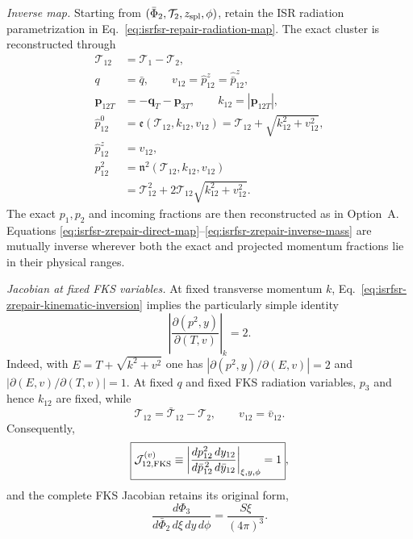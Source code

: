 \documentclass[11pt]{article}
\newcommand{\Ph}{\Phi}
\begin{document}
\medskip
\noindent
\textit{Inverse map.}
Starting from $(\bar\Ph_2,\mathcal T_2,z_{\rm spl},\phi)$, retain the ISR radiation parametrization in
Eq.~\eqref{eq:isrfsr-repair-radiation-map}.  The exact cluster is reconstructed through
\begin{align}
\mathcal T_{12}
&=\mathcal T_1-\mathcal T_2,
\label{eq:isrfsr-zrepair-inverse-T12}
\\
q&=\bar q,
\qquad
v_{12}=\hat p_{12}^z=\hat{\bar p}_{12}^z,
\label{eq:isrfsr-zrepair-inverse-preserved}
\\
\boldsymbol p_{12T}
&=-\boldsymbol q_T-\boldsymbol p_{3T},
\qquad
k_{12}=|\boldsymbol p_{12T}|,
\label{eq:isrfsr-zrepair-inverse-pt}
\\
\hat p_{12}^0
&=
\mathfrak e(\mathcal T_{12},k_{12},v_{12})
=
\mathcal T_{12}+\sqrt{k_{12}^2+v_{12}^2},
\nonumber\\
\hat p_{12}^z
&=v_{12},
\label{eq:isrfsr-zrepair-inverse-components}
\\
p_{12}^2
&=
\mathfrak n^2(\mathcal T_{12},k_{12},v_{12})
\nonumber\\
&=
\mathcal T_{12}^2
+2\mathcal T_{12}\sqrt{k_{12}^2+v_{12}^2}.
\label{eq:isrfsr-zrepair-inverse-mass}
\end{align}
The exact $p_1,p_2$ and incoming fractions are then reconstructed as in Option~A.  Equations
\eqref{eq:isrfsr-zrepair-direct-map}--\eqref{eq:isrfsr-zrepair-inverse-mass} are mutually inverse wherever
both the exact and projected momentum fractions lie in their physical ranges.

\medskip
\noindent
\textit{Jacobian at fixed FKS variables.}
At fixed transverse momentum $k$, Eq.~\eqref{eq:isrfsr-zrepair-kinematic-inversion} implies the particularly
simple identity
\begin{equation}
\left|
\frac{\partial(p^2,y)}
{\partial(T,v)}
\right|_k
=2.
\label{eq:isrfsr-zrepair-basic-jacobian}
\end{equation}
Indeed, with $E=T+\sqrt{k^2+v^2}$ one has
$|\partial(p^2,y)/\partial(E,v)|=2$ and
$|\partial(E,v)/\partial(T,v)|=1$.  At fixed $q$ and fixed FKS radiation variables, $p_3$ and hence
$k_{12}$ are fixed, while
\begin{equation}
\mathcal T_{12}=\bar{\mathcal T}_{12}-\mathcal T_2,
\qquad
v_{12}=\bar v_{12}.
\label{eq:isrfsr-zrepair-Tv-transformation}
\end{equation}
Consequently,
\begin{equation}
\boxed{
\mathcal J_{12,\rm FKS}^{(v)}
\equiv
\left|
\frac{d p_{12}^2\,dy_{12}}
{d\bar p_{12}^{\,2}\,d\bar y_{12}}
\right|_{\xi,y,\phi}
=1
},
\label{eq:isrfsr-zrepair-cluster-jacobian}
\end{equation}
and the complete FKS Jacobian retains its original form,
\begin{equation}
\boxed{
\frac{d\Ph_3}
{d\bar\Ph_2\,d\xi\,dy\,d\phi}
=
\frac{S\xi}{(4\pi)^3}
}.
\label{eq:isrfsr-zrepair-fks-jacobian}
\end{equation}
\end{document}
